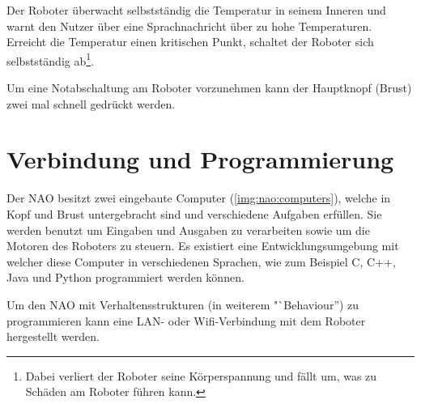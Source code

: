         Der Roboter überwacht selbstständig die Temperatur in seinem Inneren und
        warnt den Nutzer über eine Sprachnachricht über zu hohe Temperaturen.
        Erreicht die Temperatur einen kritischen Punkt, schaltet der Roboter
        sich selbstständig ab\footnote{Dabei verliert der Roboter seine
            Körperspannung und fällt um, was zu Schäden am Roboter führen
            kann.
        }.

        Um eine Notabschaltung am Roboter vorzunehmen kann der Hauptknopf
        (Brust) zwei mal schnell gedrückt werden.

    \section{Verbindung und Programmierung}

        Der NAO besitzt zwei eingebaute Computer (\autoref{img:nao:computers}),
        welche in Kopf und Brust
        untergebracht sind und verschiedene Aufgaben erfüllen.
        Sie werden benutzt um Eingaben und Ausgaben zu verarbeiten sowie um die
        Motoren des Roboters zu steuern.
        Es existiert eine Entwicklungsumgebung mit welcher diese Computer in
        verschiedenen Sprachen, wie zum Beispiel C, C++, Java und Python
        programmiert werden können.

        Um den NAO mit Verhaltensstrukturen (in weiterem "`Behaviour'') zu
        programmieren kann eine \ac{LAN}- oder \ac{Wifi}-Verbindung mit dem
        Roboter hergestellt werden.


